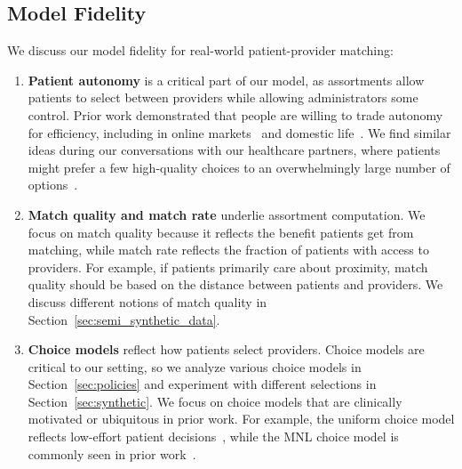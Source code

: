 \subsection{Model Fidelity}
We discuss our model fidelity for real-world patient-provider matching:
\begin{enumerate}
    \item \textbf{Patient autonomy} is a critical part of our model, as assortments allow patients to select between providers while allowing administrators some control. Prior work demonstrated that people are willing to trade autonomy for efficiency, including in online markets~\citep{autonomy_efficiency} and domestic life~\citep{india_efficiency_autonomy}. 
    We find similar ideas during our conversations with our healthcare partners, where patients might prefer a few high-quality choices to an overwhelmingly large number of options~\citep{choice_overload}. 
    \item \textbf{Match quality and match rate} underlie assortment computation. We focus on match quality because it reflects the benefit patients get from matching, while match rate reflects the fraction of patients with access to providers. For example, if patients primarily care about proximity, match quality should be based on the distance between patients and providers. We discuss different notions of match quality in Section~\ref{sec:semi_synthetic_data}. 
    \item \textbf{Choice models} reflect how patients select providers. Choice models are critical to our setting, so we analyze various choice models in Section~\ref{sec:policies} and experiment with different selections in Section~\ref{sec:synthetic}. 
    We focus on choice models that are clinically motivated or ubiquitous in prior work. 
    For example, the uniform choice model reflects low-effort patient decisions~\citep{choosing_doctor}, while the MNL choice model is commonly seen in prior work~\citep{assortment_mnl}. 
\end{enumerate}

